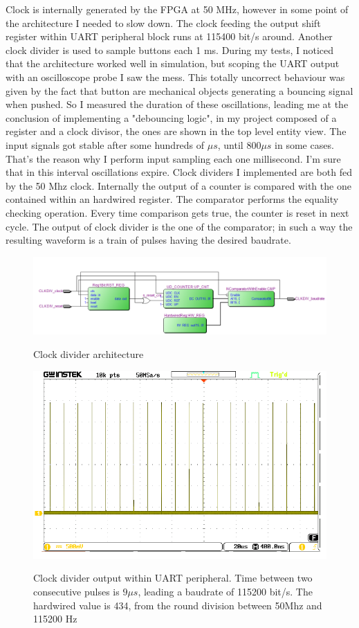 Clock is internally generated by the FPGA at 50 MHz, however in some point of the architecture I needed to slow down. The clock feeding the output shift register within UART peripheral block runs at 115400 bit/s around. Another clock divider is used to sample buttons each 1 ms. During my tests, I noticed that the architecture worked well in simulation, but scoping the UART output with an oscilloscope probe I saw the mess. This totally uncorrect behaviour was given by the fact that button are mechanical objects generating a bouncing signal when pushed. So I measured the duration of these oscillations, leading me at the conclusion of implementing a "debouncing logic", in my project composed of a register and a clock divisor, the ones are shown in the top level entity view. The input signals got stable after some hundreds of $\mu s$, until $800 \mu s$ in some cases. That's the reason why I perform input sampling each one millisecond. I'm sure that in this interval oscillations expire.
\newline
\newline
Clock dividers I implemented are both fed by the 50 Mhz clock. Internally the output of a counter is compared with the one contained within an hardwired register. The comparator performs the equality checking operation. Every time comparison gets true, the counter is reset in next cycle. 
 The output of clock divider is the one of the comparator; in such a way the resulting waveform is a train of pulses having the desired baudrate.
 \begin{figure}[H]
\centering
\includegraphics[scale=.6]{Immagini/17}
\label{17}
\caption{Clock divider architecture}
\end{figure}
 \begin{figure}[H]
\centering
\includegraphics{Immagini/16}
\label{16}
\caption{Clock divider output within UART peripheral. Time between two consecutive pulses is $9 \mu s$, leading a baudrate of 115200 bit/s. The hardwired value is 434, from the round division between 50Mhz and 115200 Hz}
\end{figure}

